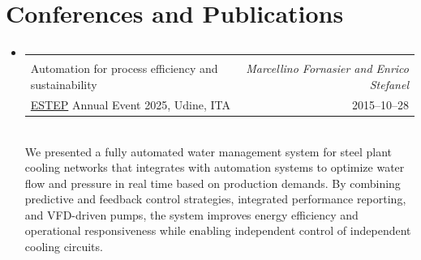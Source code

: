 \documentclass[a4paper,english]{article} %
\makeatletter
\newcommand{\resumeSubheading}[4]{
  \vspace{2pt}\item
    \begin{tabular*}{0.97\textwidth}{l@{\extracolsep{\fill}}r}
      \textbf{#1} & \textit{\small #2} \\
      #3 & \small #4 \\
    \end{tabular*}\vspace{5pt}\\
}
\makeatother
\begin{document}
\begin{itemize}[leftmargin=*]
		 \vspace{0.5em}

	\end{itemize}

\section{Conferences and Publications}
  \begin{itemize}[leftmargin=*]
	  \resumeSubheading
      		{\shortstack[l]{Intelligent water management in steelmaking:\\Automation for process efficiency and sustainability}}{Marcellino Fornasier and Enrico Stefanel}
      		{\href{https://www.estep.eu}{ESTEP} Annual Event 2025, Udine, ITA}{2015--10--28}
			We presented a fully automated water management system for steel plant cooling networks that integrates with automation systems to optimize water flow and pressure in real time based on production demands. By combining predictive and feedback control strategies, integrated performance reporting, and VFD-driven pumps, the system improves energy efficiency and operational responsiveness while enabling independent control of independent cooling circuits.
  \end{itemize}

\end{document}

